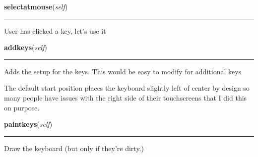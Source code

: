     \vspace{0.5ex}

\hspace{.8\funcindent}\begin{boxedminipage}{\funcwidth}

    \raggedright \textbf{selectatmouse}(\textit{self})

    \vspace{-1.5ex}

    \rule{\textwidth}{0.5\fboxrule}
\setlength{\parskip}{2ex}
    User has clicked a key, let's use it

\setlength{\parskip}{1ex}
    \end{boxedminipage}

    \label{pygame-asteroids:virtual_keyboard:VirtualKeyboard:addkeys}

    \vspace{0.5ex}

\hspace{.8\funcindent}\begin{boxedminipage}{\funcwidth}

    \raggedright \textbf{addkeys}(\textit{self})

    \vspace{-1.5ex}

    \rule{\textwidth}{0.5\fboxrule}
\setlength{\parskip}{2ex}
    Adds the setup for the keys.  This would be easy to modify for 
    additional keys

    The default start position places the keyboard slightly left of center 
    by design so many people have issues with the right side of their 
    touchscreens that I did this on purpose.

\setlength{\parskip}{1ex}
    \end{boxedminipage}

    \label{pygame-asteroids:virtual_keyboard:VirtualKeyboard:paintkeys}

    \vspace{0.5ex}

\hspace{.8\funcindent}\begin{boxedminipage}{\funcwidth}

    \raggedright \textbf{paintkeys}(\textit{self})

    \vspace{-1.5ex}

    \rule{\textwidth}{0.5\fboxrule}
\setlength{\parskip}{2ex}
    Draw the keyboard (but only if they're dirty.)

\setlength{\parskip}{1ex}
    \end{boxedminipage}

